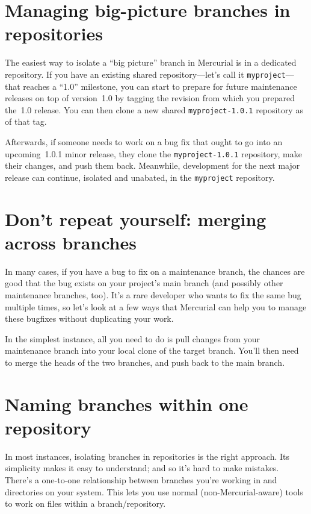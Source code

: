 \section{Managing big-picture branches in repositories}

The easiest way to isolate a ``big picture'' branch in Mercurial is in
a dedicated repository.  If you have an existing shared
repository---let's call it \texttt{myproject}---that reaches a ``1.0''
milestone, you can start to prepare for future maintenance releases on
top of version~1.0 by tagging the revision from which you prepared
the~1.0 release.
You can then clone a new shared \texttt{myproject-1.0.1} repository as
of that tag.

Afterwards, if someone needs to work on a bug fix that ought to go
into an upcoming~1.0.1 minor release, they clone the
\texttt{myproject-1.0.1} repository, make their changes, and push them
back.
Meanwhile, development for the next major release can continue,
isolated and unabated, in the \texttt{myproject} repository.

\section{Don't repeat yourself: merging across branches}

In many cases, if you have a bug to fix on a maintenance branch, the
chances are good that the bug exists on your project's main branch
(and possibly other maintenance branches, too).  It's a rare developer
who wants to fix the same bug multiple times, so let's look at a few
ways that Mercurial can help you to manage these bugfixes without
duplicating your work.

In the simplest instance, all you need to do is pull changes from your
maintenance branch into your local clone of the target branch.
You'll then need to merge the heads of the two branches, and push back
to the main branch.

\section{Naming branches within one repository}

In most instances, isolating branches in repositories is the right
approach.  Its simplicity makes it easy to understand; and so it's
hard to make mistakes.  There's a one-to-one relationship between
branches you're working in and directories on your system.  This lets
you use normal (non-Mercurial-aware) tools to work on files within a
branch/repository.

